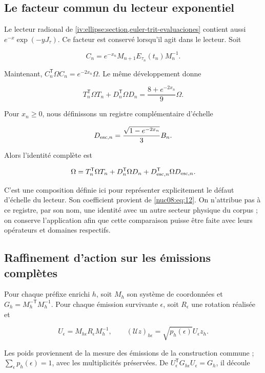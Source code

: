\subsection{Le facteur commun du lecteur exponentiel}

Le lecteur radional de \cref{iv:ellipse:section,euler-trit-evaluaciones} contient aussi \(e^{-x}\exp(-yJ_\tau)\). Ce facteur est conservé lorsqu’il agit dans le lecteur. Soit

\[
C_n=e^{-x_n}M_{n+1}E_{\tau_n}(t_n)M_n^{-1}.
\]

Maintenant, \(C_n^\mathsf T\Omega C_n=e^{-2x_n}\Omega\). Le même développement donne

\begin{equation}
T_n^\mathsf T\Omega T_n+D_n^\mathsf T\Omega D_n
=\frac{8+e^{-2x_n}}9\Omega.
\label{nuc08:eq:12}
\end{equation}

Pour \(x_n\geq0\), nous définissons un registre complémentaire d’échelle


\[
D_{{\rm esc},n}=\frac{\sqrt{1-e^{-2x_n}}}{3}B_n.
\]

Alors l’identité complète est

\begin{equation}
\Omega=T_n^\mathsf T\Omega T_n+D_n^\mathsf T\Omega D_n
+D_{{\rm esc},n}^\mathsf T\Omega D_{{\rm esc},n}.
\label{nuc08:eq:13}
\end{equation}

C’est une composition définie ici pour représenter explicitement le défaut d’échelle du lecteur. Son coefficient provient de \eqref{nuc08:eq:12}. On n’attribue pas à ce registre, par son nom, une identité avec un autre secteur physique du corpus ; on conserve l’application afin que cette comparaison puisse être faite avec leurs opérateurs et domaines respectifs.

\subsection{Raffinement d’action sur les émissions complètes}

Pour chaque préfixe enrichi \(h\), soit \(M_h\) son système de coordonnées et \(G_h=M_h^{-\mathsf T}M_h^{-1}\). Pour chaque émission survivante \(\epsilon\), soit \(R_\epsilon\) une rotation réalisée et

\[
U_\epsilon=M_{h\epsilon}R_\epsilon M_h^{-1},\qquad
(\mathscr U z)_{h\epsilon}=\sqrt{p_h(\epsilon)}U_\epsilon z_h.
\]

Les poids proviennent de la mesure des émissions de la construction commune ; \(\sum_\epsilon p_h(\epsilon)=1\), avec les multiplicités préservées. De \(U_\epsilon^\mathsf TG_{h\epsilon}U_\epsilon=G_h\), il découle

